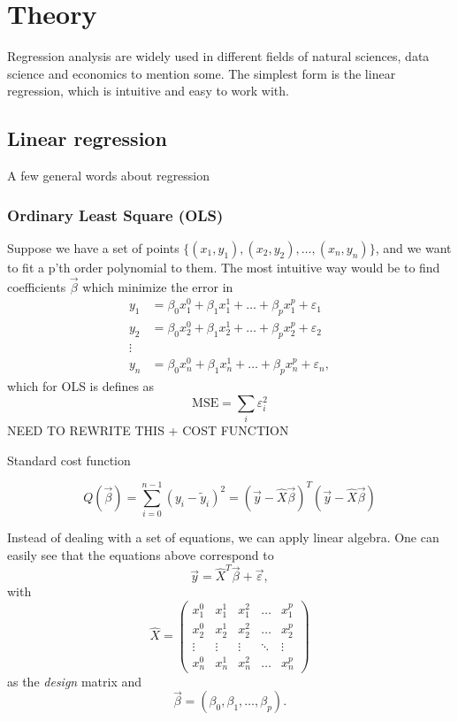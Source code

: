 \section{Theory} \label{sec:theory}
Regression analysis are widely used in different fields of natural sciences, data science and economics to mention some. The simplest form is the linear regression, which is intuitive and easy to work with. 
 
\subsection{Linear regression} \label{sec:regression}
A few general words about regression

\subsubsection{Ordinary Least Square (OLS)} \label{sec:OLS}
Suppose we have a set of points $\{(x_1, y_1), (x_2, y_2),\hdots, (x_n, y_n)\}$, and we want to fit a p'th order polynomial to them. The most intuitive way would be to find coefficients $\vec{\beta}$ which minimize the error in
\begin{align*}
y_1&=\beta_0x_1^0+\beta_1x_1^1+\hdots+\beta_px_1^p+\varepsilon_1\\
y_2&=\beta_0x_2^0+\beta_1x_2^1+\hdots+\beta_px_2^p+\varepsilon_2\\
\vdots\\
y_n&=\beta_0x_n^0+\beta_1x_n^1+\hdots+\beta_px_n^p+\varepsilon_n,
\end{align*}
which for OLS is defines as
\begin{equation}
\text{MSE}=\sum_i\varepsilon_i^2
\end{equation}
NEED TO REWRITE THIS + COST FUNCTION

Standard cost function

\begin{equation}
Q(\vec{\beta})=\sum_{i=0}^{n-1}(y_i-\tilde{y}_i)^2=(\vec{y}-\hat{X}\vec{\beta})^T(\vec{y}-\hat{X}\vec{\beta})
\end{equation}

Instead of dealing with a set of equations, we can apply linear algebra. One can easily see that the equations above correspond to
\begin{equation}
\vec{y}=\hat{X}^T\vec{\beta}+\vec{\varepsilon},
\label{eq:y_xb}
\end{equation}
with
\begin{equation}
\hat{X}=\begin{pmatrix}
x_1^0&x_1^1&x_1^2&\hdots&x_1^p\\
x_2^0&x_2^1&x_2^2&\hdots&x_2^p\\
\vdots&\vdots&\vdots&\ddots&\vdots\\
x_n^0&x_n^1&x_n^2&\hdots&x_n^p
\end{pmatrix}
\end{equation}
as the \textit{design} matrix and
\begin{equation}
\vec{\beta}=(\beta_0, \beta_1, \hdots, \beta_p).
\end{equation}

